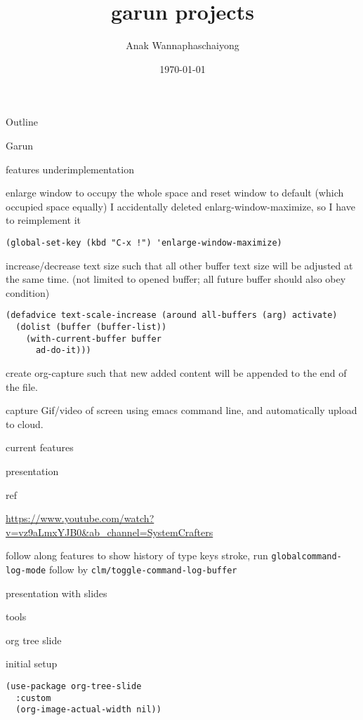 \documentclass[presentation]{beamer}
\author{Anak Wannaphaschaiyong}
\date{\today}
\title{garun projects}
\begin{document}
\maketitle
\begin{frame}{Outline}
\tableofcontents
\end{frame}


\begin{frame}[label={sec:org5d134d3},fragile]{Garun}
 \begin{block}{features underimplementation}
\begin{block}{enlarge window to occupy the whole space and reset window to default (which occupied space equally)}
I accidentally deleted enlarg-window-maximize, so I have to reimplement it
\begin{verbatim}
(global-set-key (kbd "C-x !") 'enlarge-window-maximize)
\end{verbatim}
\end{block}
\begin{block}{increase/decrease text size such that all other buffer text size will be adjusted at the same time. (not limited to opened buffer; all future buffer should also obey condition)}
\begin{verbatim}
(defadvice text-scale-increase (around all-buffers (arg) activate)
  (dolist (buffer (buffer-list))
    (with-current-buffer buffer
      ad-do-it)))
\end{verbatim}
\end{block}
\begin{block}{create org-capture such that new added content will be appended to the end of the file.}
\end{block}
\begin{block}{capture Gif/video of screen using emacs command line, and automatically upload to cloud.}
\end{block}
\end{block}
\begin{block}{current features}
\begin{block}{presentation}
\begin{block}{ref}
\begin{block}{\url{https://www.youtube.com/watch?v=vz9aLmxYJB0\&ab\_channel=SystemCrafters}}
\end{block}
\end{block}
\begin{block}{follow along features}
to show history of type keys stroke,
run \texttt{globalcommand-log-mode} follow by \texttt{clm/toggle-command-log-buffer}
\end{block}
\begin{block}{presentation with slides}
\begin{block}{tools}
\begin{block}{org tree slide}
\end{block}
\end{block}
\begin{block}{initial setup}
\begin{verbatim}
(use-package org-tree-slide
  :custom
  (org-image-actual-width nil))
\end{verbatim}


\end{block}
\end{block}
\end{block}
\end{block}
\end{frame}
\end{document}
